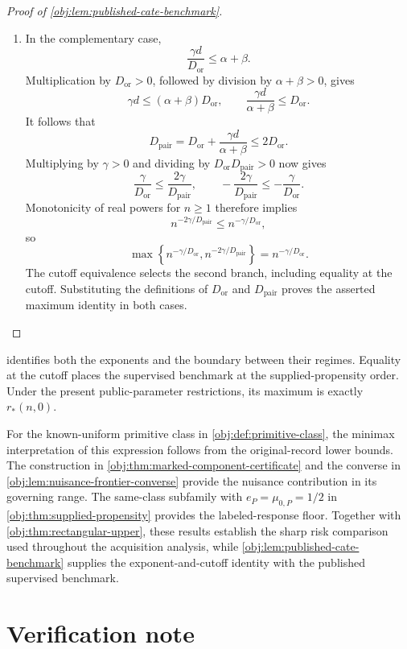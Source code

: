 \documentclass[11pt]{article}
\begin{document}
\begin{proof}[Proof of \cref{obj:lem:published-cate-benchmark}]
\begin{enumerate}
\item In the complementary case,
\[
\frac{\gamma d}{D_{\mathrm{or}}}\le\alpha+\beta.
\]
Multiplication by \(D_{\mathrm{or}}>0\), followed by division by
\(\alpha+\beta>0\), gives
\[
\gamma d\le(\alpha+\beta)D_{\mathrm{or}},
\qquad
\frac{\gamma d}{\alpha+\beta}\le D_{\mathrm{or}}.
\]
It follows that
\[
D_{\mathrm{pair}}
=D_{\mathrm{or}}+\frac{\gamma d}{\alpha+\beta}
\le2D_{\mathrm{or}}.
\]
Multiplying by \(\gamma>0\) and dividing by
\(D_{\mathrm{or}}D_{\mathrm{pair}}>0\) now gives
\[
\frac{\gamma}{D_{\mathrm{or}}}
\le\frac{2\gamma}{D_{\mathrm{pair}}},
\qquad
-\frac{2\gamma}{D_{\mathrm{pair}}}
\le-\frac{\gamma}{D_{\mathrm{or}}}.
\]
Monotonicity of real powers for \(n\ge1\) therefore implies
\[
n^{-2\gamma/D_{\mathrm{pair}}}
\le n^{-\gamma/D_{\mathrm{or}}},
\]
so
\[
\max\left\{
n^{-\gamma/D_{\mathrm{or}}},
n^{-2\gamma/D_{\mathrm{pair}}}
\right\}
=n^{-\gamma/D_{\mathrm{or}}}.
\]
The cutoff equivalence selects the second branch, including equality at the cutoff. Substituting the definitions of \(D_{\mathrm{or}}\) and \(D_{\mathrm{pair}}\) proves the asserted maximum identity in both cases.
\end{enumerate}
\end{proof}

 identifies both the exponents and the boundary between their regimes. Equality at the cutoff places the supervised benchmark at the supplied-propensity order. Under the present public-parameter restrictions, its maximum is exactly \(r_*(n,0)\).

For the known-uniform primitive class in \cref{obj:def:primitive-class}, the minimax interpretation of this expression follows from the original-record lower bounds. The construction in \cref{obj:thm:marked-component-certificate} and the converse in \cref{obj:lem:nuisance-frontier-converse} provide the nuisance contribution in its governing range. The same-class subfamily with \(e_P=\mu_{0,P}=1/2\) in \cref{obj:thm:supplied-propensity} provides the labeled-response floor. Together with \cref{obj:thm:rectangular-upper}, these results establish the sharp risk comparison used throughout the acquisition analysis, while \cref{obj:lem:published-cate-benchmark} supplies the exponent-and-cutoff identity with the published supervised benchmark.


\section{Verification note}\label{sec:verification-note}
\end{document}
